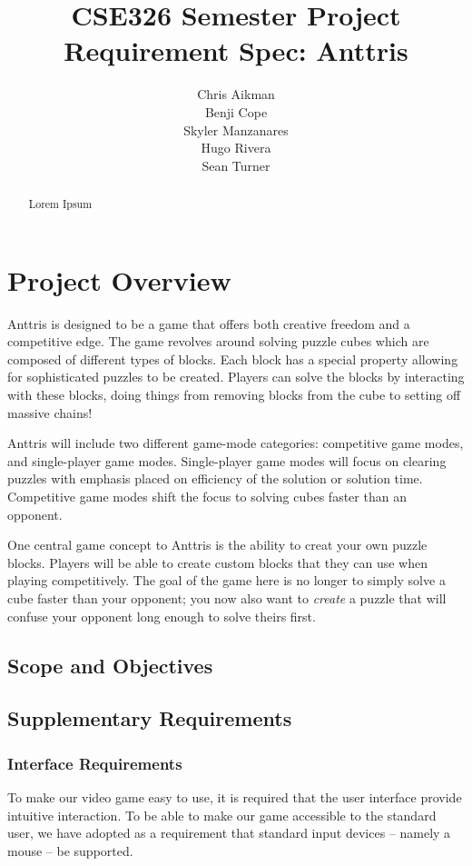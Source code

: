 \documentclass[12pt]{article}
\begin{document}
\title{CSE326 Semester Project Requirement Spec: Anttris}
\author{Chris Aikman\\Benji Cope\\Skyler Manzanares\\Hugo Rivera\\Sean Turner}
\maketitle
\begin{abstract}
Lorem Ipsum
\end{abstract}
\section{Project Overview}\label{overview-SM}
Anttris is designed to be a game that offers both creative freedom and a competitive edge. The game revolves around solving puzzle cubes which are composed of different types of blocks. Each block has a special property allowing for sophisticated puzzles to be created. Players can solve the blocks by interacting with these blocks, doing things from removing blocks from the cube to setting off massive chains!

Anttris will include two different game-mode categories: competitive game modes, and single-player game modes. Single-player game modes will focus on clearing puzzles with emphasis placed on efficiency of the solution or solution time. Competitive game modes shift the focus to solving cubes faster than an opponent.

One central game concept to Anttris is the ability to creat your own puzzle blocks. Players will be able to create custom blocks that they can use when playing competitively. The goal of the game here is no longer to simply solve a cube faster than your opponent; you now also want to \textsl{create} a puzzle that will confuse your opponent long enough to solve theirs first.
\subsection{Scope and Objectives}\label{scope-obj-CA}
\subsection{Supplementary Requirements}\label{supplementary-reqs-SM}
\subsubsection{Interface Requirements}
To make our video game easy to use, it is required that the user interface
provide intuitive interaction. To be able to make our game accessible to
the standard user, we have adopted as a requirement that standard
input devices -- namely a mouse -- be supported.
\end{document}

